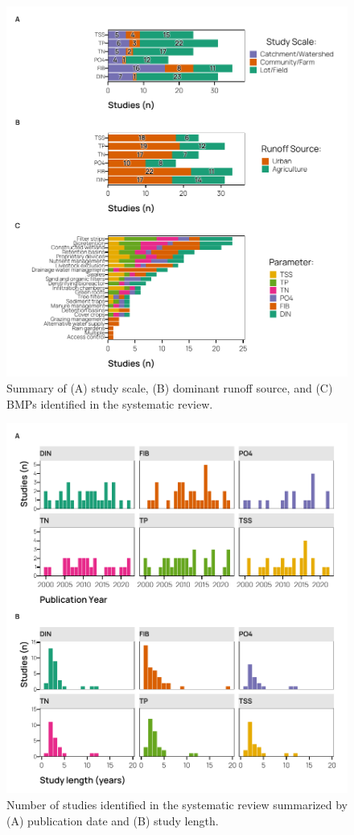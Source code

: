 \documentclass[utf8]{FrontiersinHarvard}
\begin{document}
\begin{figure}
\includegraphics[width=1\linewidth,]{../figures/bmp_summary} \caption{Summary of (A) study scale, (B) dominant runoff source, and (C) BMPs identified in the systematic review.}\label{fig:bmpsummary}
\end{figure}

\begin{figure}
\includegraphics[width=1\linewidth,]{../figures/bmp_temporal_summary} \caption{Number of studies identified in the systematic review summarized by (A) publication date and (B) study length.}\label{fig:bmptemporal}
\end{figure}
\end{document}
